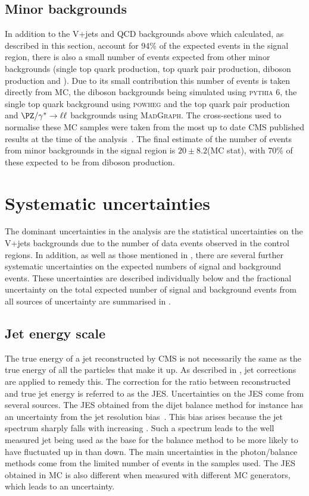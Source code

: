 \subsection{Minor backgrounds}
\label{sec:promptminor}
In addition to the V+jets and QCD backgrounds above which calculated, as described in this section, account for 94\% of the expected events in the signal region, there is also a small number of events expected from other minor backgrounds (single top quark production, top quark pair production, diboson production and \Zmumu). Due to its small contribution this number of events is taken directly from \ac{MC}, the diboson backgrounds being simulated using \textsc{pythia 6}, the single top quark background using \textsc{powheg} and the top quark pair production and $\PZ/\gamma^{*}\rightarrow\ell\ell$ backgrounds using \textsc{MadGraph}. The cross-sections used to normalise these \ac{MC} samples were taken from the most up to date CMS published results at the time of the analysis~\cite{CMS:2012fza,CMS:2012iza,CMS:2012zva,CMS:2013qea,CMS:2013hea}. The final estimate of the number of events from minor backgrounds in the signal region is $20\pm 8.2$(MC stat), with 70\% of these expected to be from diboson production.


\section{Systematic uncertainties}
\label{sec:promptsyst}
The dominant uncertainties in the analysis are the statistical uncertainties on the V+jets backgrounds due to the number of data events observed in the control regions. In addition, as well as those mentioned in , there are several further systematic uncertainties on the expected numbers of signal and background events. These uncertainties are described individually below and the fractional uncertainty on the total expected number of signal and background events from all sources of uncertainty are summarised in .
\subsection{Jet energy scale}
\label{sec:promptjes}
The true energy of a jet reconstructed by CMS is not necessarily the same as the true energy of all the particles that make it up. As described in , jet corrections are applied to remedy this. The correction for the ratio between reconstructed and true jet energy is referred to as the \ac{JES}. Uncertainties on the \ac{JES} come from several sources. The \ac{JES} obtained from the dijet \pt balance method for instance has an uncertainty from the jet resolution bias~\cite{CMS-JME-10-011}. This bias arises because the jet \pt spectrum sharply falls with increasing \pt. Such a spectrum leads to the well measured jet being used as the base for the balance method to be more likely to have fluctuated up in \pt than down. The main uncertainties in the photon/\PZ balance methods come from the limited number of events in the samples used. The \ac{JES} obtained in \ac{MC} is also different when measured with different \ac{MC} generators, which leads to an uncertainty.

